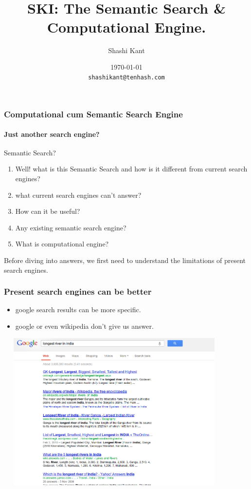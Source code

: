 \documentclass{beamer}
\title[SKI: The Computational Search Engine.\hspace{1.6cm}\insertframenumber/\inserttotalframenumber]{SKI: The Semantic Search \& Computational Engine.}
\author[Shashi Kant]{Shashi Kant}
\date{\today \\ \texttt{shashikant@tenhash.com}}
\institute{Department of Computer Science \& Engineering \\ National Institute of Technology, Jamshedpur}
\begin{document}
\begin{frame}
   \titlepage
\end{frame}



\begin{frame}
 \frametitle{Computational cum Semantic Search Engine}
 \framesubtitle{Just another search engine?}
 \begin{block}{Semantic Search?} \pause
 \begin{enumerate}
   \item  Well! what is this \alert{Semantic Search} and how is it different from current search engines? 
   \pause
   \item what current search engines can't answer?
   \pause
   \item How can it be useful?
   \pause
   \item Any existing semantic search engine? 
   \pause
   \item What is computational engine?
  \end{enumerate}
 \pause
 \end{block}
 
 Before diving into answers, we first need to understand the limitations of present search engines.
 
 
\end{frame}

\begin{frame}[t]

 \frametitle{Present search engines can be better}
 \pause
 \begin{itemize}
  \item google search results can be more specific.
  \pause
  \item google or even wikipedia don't give us answer.
 \end{itemize}
\end{frame}
\begin{frame}
   \includegraphics[width=12cm,height=8cm]{two.png}
\end{frame}
\end{document}
